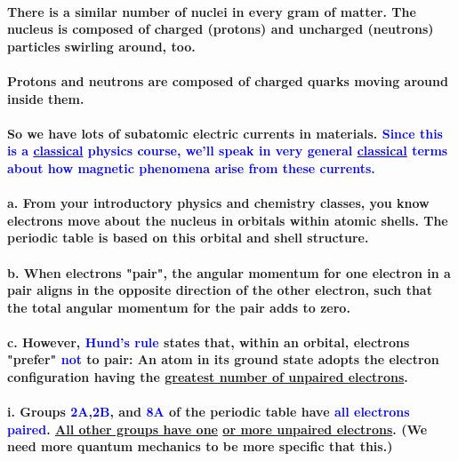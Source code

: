 \documentclass{article}
\begin{document}
\paragraph{There is a similar number of nuclei in every gram of matter. The nucleus is composed of charged (protons) and uncharged (neutrons) particles swirling around, too.}
\paragraph{Protons and neutrons are composed of charged quarks moving around inside them.}
\paragraph{So we have lots of subatomic electric currents in materials. \textcolor{blue}{Since this is a \underline{classical} physics course, we'll speak in very general \underline{classical} terms about how magnetic phenomena arise from these currents.}}
\paragraph{\indent a. From your introductory physics and chemistry classes, you know electrons move about the nucleus in orbitals within atomic shells. The periodic table is based on this orbital and shell structure.}
\paragraph{\indent b. When electrons "pair", the angular momentum for one electron in a pair aligns in the opposite direction of the other electron, such that the total angular momentum for the pair adds to zero.}
\paragraph{\indent c. However, \textcolor{blue}{Hund's rule} states that, within an orbital, electrons "prefer" \textcolor{blue}{not} to pair: An atom in its ground state adopts the electron configuration having the \underline{greatest number of unpaired electrons}.}
\paragraph{\indent\indent i. Groups \textcolor{blue}{2A},\textcolor{blue}{2B}, and \textcolor{blue}{8A} of the periodic table have \textcolor{blue}{all electrons paired}. \underline{All other groups have one} \underline{or more unpaired electrons}. (We need more quantum mechanics to be more specific that this.)}
\end{document}

